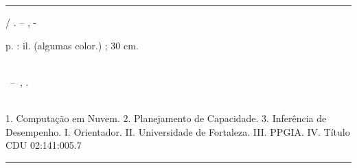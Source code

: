 %
%     
\begin{fichacatalografica}
  \vspace*{\fill}         %
  \hrule              %
  \begin{center}          %
  \begin{minipage}[c]{12.5cm}   %
  
  \imprimirautor
  
  \hspace{0.5cm} \imprimirtitulo  / \imprimirautor. --
  \imprimirlocal, \imprimirdata-
  
  \hspace{0.5cm} \pageref{LastPage} p. : il. (algumas color.) ; 30 cm.\\
  
  \hspace{0.5cm} \imprimirorientadorRotulo~\imprimirorientador\\
  
  \hspace{0.5cm}
  \parbox[t]{\textwidth}{\imprimirtipotrabalho~--~\imprimirinstituicao,
  \imprimirdata.}\\
  
  \hspace{0.5cm}
    1. Computação em Nuvem.
    2. Planejamento de Capacidade.
    3. Inferência de Desempenho.
    I. Orientador.
    II. Universidade de Fortaleza.
    III. PPGIA.
    IV. Título\\      
  
  \hspace{8.75cm} CDU 02:141:005.7\\
  
  \end{minipage}
  \end{center}
  \hrule
\end{fichacatalografica}

